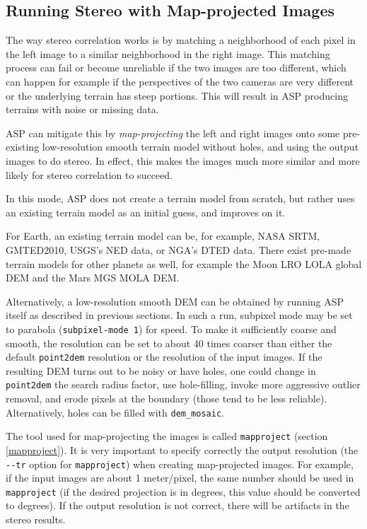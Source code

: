 \subsection{Running Stereo with Map-projected Images}
\label{mapproj-example}

The way stereo correlation works is by matching a neighborhood of each
pixel in the left image to a similar neighborhood in the right image.
This matching process can fail or become unreliable if the two images
are too different, which can happen for example if the perspectives
of the two cameras are very different or the underlying terrain has
steep portions. This will result in ASP producing terrains with noise or
missing data.

ASP can mitigate this by \textit{map-projecting} the left and right
images onto some pre-existing low-resolution smooth terrain model
without holes, and using the output images to do stereo. In effect, this
makes the images much more similar and more likely for stereo
correlation to succeed.

In this mode, ASP does not create a terrain model from scratch,
but rather uses an existing terrain model as an initial guess, and
improves on it.

For Earth, an existing terrain model can be, for example, NASA SRTM,
GMTED2010, USGS's NED data, or NGA's DTED data. There exist pre-made
terrain models for other planets as well, for example the Moon LRO LOLA
global DEM and the Mars MGS MOLA DEM.


Alternatively, a low-resolution smooth DEM can be obtained by running
ASP itself as described in previous sections. In such a run, subpixel
mode may be set to parabola (\texttt{subpixel-mode 1}) for speed. To
make it sufficiently coarse and smooth, the resolution can be set to
about 40 times coarser than either the default \texttt{point2dem}
resolution or the resolution of the input images. If the resulting DEM
turns out to be noisy or have holes, one could change in
\texttt{point2dem} the search radius factor, use hole-filling, invoke more
aggressive outlier removal, and erode pixels at the boundary (those
tend to be less reliable). Alternatively, holes can be filled with
\texttt{dem\_mosaic}.

The tool used for map-projecting the images is called
\texttt{mapproject} (section \ref{mapproject}). It is very important to
specify correctly the output resolution (the \texttt{-\/-tr} option for
\texttt{mapproject}) when creating map-projected images. For example, if
the input images are about 1 meter/pixel, the same number should be used
in \texttt{mapproject} (if the desired projection is in degrees, this
value should be converted to degrees). If the output resolution is not
correct, there will be artifacts in the stereo results.

